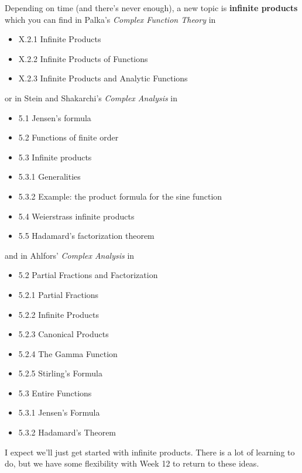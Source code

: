 \documentclass{homework}
\begin{document}
Depending on time (and there's never enough), a new topic is
\textbf{infinite products} which you can find in Palka's
\textit{Complex Function Theory} in
\begin{itemize}  
\item X.2.1 Infinite Products
\item X.2.2 Infinite Products of Functions
\item X.2.3 Infinite Products and Analytic Functions
\end{itemize}
or in Stein and Shakarchi's \textit{Complex Analysis} in
\begin{itemize}
\item 5.1 Jensen's formula
\item 5.2 Functions of finite order
\item 5.3 Infinite products
\item 5.3.1 Generalities
\item 5.3.2 Example: the product formula for the sine function
\item 5.4 Weierstrass infinite products
\item 5.5 Hadamard's factorization theorem
\end{itemize}
and in Ahlfors' \textit{Complex Analysis} in
\begin{itemize}
\item 5.2 Partial Fractions and Factorization
\item 5.2.1 Partial Fractions
\item 5.2.2 Infinite Products
\item 5.2.3 Canonical Products
\item 5.2.4 The Gamma Function
\item 5.2.5 Stirling's Formula
\item 5.3 Entire Functions
\item 5.3.1 Jensen's Formula
\item 5.3.2 Hadamard's Theorem
\end{itemize}
I expect we'll just get started with infinite products.  There is a
lot of learning to do, but we have some flexibility with Week 12 to
return to these ideas.
\end{document}
